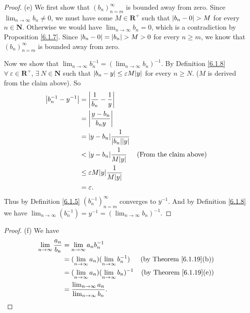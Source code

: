 \begin{proof}{(e)}
    We first show that \((b_n)_{n = m}^\infty\) is bounded away from zero.
    Since \(\lim_{n \to \infty} b_n \neq 0\), we must have some \(M \in \mathbf{R}^+\) such that \(\abs*{b_n - 0} > M\) for every \(n \in \mathbf{N}\).
    Otherwise we would have \(\lim_{n \to \infty} b_n = 0\), which is a contradiction by Proposition \ref{6.1.7}.
    Since \(\abs*{b_n - 0} = \abs*{b_n} > M > 0\) for every \(n \geq m\), we know that \((b_n)_{n = m}^\infty\) is bounded away from zero.

    Now we show that \(\lim_{n \to \infty} b_n^{-1} = (\lim_{n \to \infty} b_n)^{-1}\).
    By Definition \ref{6.1.8} \(\forall\ \varepsilon \in \mathbf{R}^+\), \(\exists\ N \in \mathbf{N}\) such that \(\abs*{b_n - y} \leq \varepsilon M \abs*{y}\) for every \(n \geq N\).
    (\(M\) is derived from the claim above).
    So
    \begin{align*}
        \abs*{b_n^{-1} - y^{-1}} & = \abs*{\frac{1}{b_n} - \frac{1}{y}}                                          \\
                                 & = \abs*{\frac{y - b_n}{b_n y}}                                                \\
                                 & = \abs*{y - b_n}\frac{1}{\abs*{b_n}\abs*{y}}                                  \\
                                 & < \abs*{y - b_n}\frac{1}{M\abs*{y}}           & \text{(From the claim above)} \\
                                 & \leq \varepsilon M\abs*{y}\frac{1}{M\abs*{y}}                                 \\
                                 & = \varepsilon.
    \end{align*}
    Thus by Definition \ref{6.1.5} \((b_n^{-1})_{n = m}^\infty\) converges to \(y^{-1}\).
    And by Definition \ref{6.1.8} we have \(\lim_{n \to \infty} (b_n^{-1}) = y^{-1} = (\lim_{n \to \infty} b_n)^{-1}\).
\end{proof}

\begin{proof}{(f)}
    We have
    \begin{align*}
        \lim_{n \to \infty} \frac{a_n}{b_n} & = \lim_{n \to \infty} a_n b_n^{-1}                                                               \\
                                            & = (\lim_{n \to \infty} a_n)(\lim_{n \to \infty} b_n^{-1})  & \text{(by Theorem \ref{6.1.19}(b))} \\
                                            & = (\lim_{n \to \infty} a_n)(\lim_{n \to \infty} b_n)^{-1}  & \text{(by Theorem \ref{6.1.19}(e))} \\
                                            & = \frac{\lim_{n \to \infty} a_n}{\lim_{n \to \infty} b_n}.
    \end{align*}
\end{proof}

